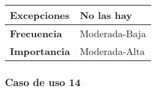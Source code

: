 \begin{longtable}{lll}
\textbf{Excepciones}                             & \multicolumn{2}{l}{No las hay}                                                                                                     \\ \hline
\textbf{Frecuencia}                              & \multicolumn{2}{l}{Moderada-Baja}                                                                                                  \\ \hline
\textbf{Importancia}                             & \multicolumn{2}{l}{Moderada-Alta}                                                                                                  \\ \hline
\end{longtable}

\subsubsection{Caso de uso 14}


